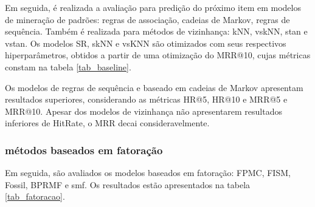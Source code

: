 \begin{table}[htbp]
  \label{tab_baseline}  
\end{table}

Em seguida, é realizada a avaliação para predição do próximo item em modelos de
mineração de padrões: regras de associação, cadeias de Markov, regras de
sequência. Também é realizada para métodos de vizinhança: kNN, vskNN, stan e
vstan. Os modelos SR, skNN e vsKNN são otimizados com seus respectivos
hiperparâmetros, obtidos a partir de uma otimização do MRR@10, cujas
métricas constam na tabela \ref{tab_baseline}.

Os modelos de regras de sequência e baseado em cadeias de Markov apresentam
resultados superiores, considerando as métricas HR@5, HR@10 e MRR@5 e MRR@10.
Apesar dos modelos de vizinhança não apresentarem resultados inferiores de HitRate,
o MRR decai consideravelmente.

\subsubsection{métodos baseados em fatoração}
Em seguida, são avaliados os modelos baseados em fatoração: FPMC, FISM, Fossil,
BPRMF e smf. Os resultados estão apresentados na tabela \ref{tab_fatoracao}.


